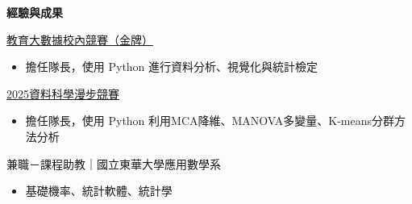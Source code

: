 \documentclass[12pt,aspectratio=169]{beamer}
\begin{document}
\begin{frame}{\textbf{經驗與成果}}
  \begin{block}{\href{https://ppt.cc/f5zmzx}{教育大數據校內競賽（金牌）}}
    \begin{itemize}
      \item 擔任隊長，使用 Python 進行資料分析、視覺化與統計檢定
    \end{itemize}
  \end{block}

  \begin{block}{\href{https://ppt.cc/fLkv3x}{2025資料科學漫步競賽}}
    \begin{itemize}
      \item 擔任隊長，使用 Python 利用MCA降維、MANOVA多變量、K-means分群方法分析
    \end{itemize}
  \end{block}


  \begin{block}{兼職－課程助教｜國⽴東華⼤學應⽤數學系}
    \begin{itemize}
      \item 基礎機率、統計軟體、統計學
    \end{itemize}
  \end{block}

\end{frame}
\end{document}
